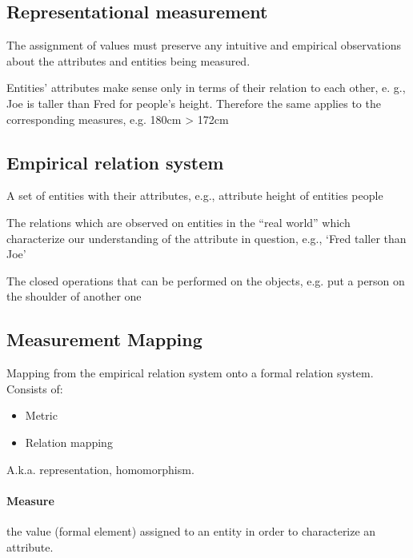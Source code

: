 \subsection{Representational measurement}

The assignment of values must preserve any intuitive and
empirical observations about the attributes and entities
being measured.

Entities' attributes make sense only in terms of their relation to each other, e.
g., Joe is taller than Fred for people's height.
Therefore the same applies to the corresponding measures, e.g. 180cm > 172cm


\subsection{Empirical relation system}

A set of entities with their attributes, e.g., attribute height of entities people


The relations which are observed on entities in the ``real world'' which
characterize our understanding of the attribute in question, e.g., `Fred taller
than Joe'


The closed operations that can be performed on the objects, e.g.
put a person on the shoulder of another one


\subsection{Measurement Mapping}

Mapping from the empirical relation system onto a formal relation system. Consists of:
\begin{itemize}
  \item Metric
  \item Relation mapping
\end{itemize}

A.k.a. representation, homomorphism.

\paragraph{Measure} the value (formal element) assigned to an entity in order to characterize an attribute.

